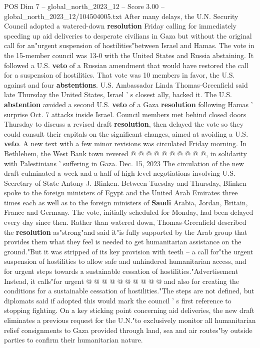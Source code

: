 \begin{textsample}{POS Dim 7 – global\_north\_2023\_12 – Score 3.00 – global\_north\_2023\_12/104504005.txt}  \label{ex:f7_pos_306}
After many delays, the U.N.
Security Council adopted a watered-down \textbf{resolution} Friday calling for immediately speeding up aid deliveries to desperate civilians in Gaza but without the original call for an"urgent suspension of hostilities"between Israel and Hamas.
The vote in the 15-member council was 13-0 with the United States and Russia abstaining.
It followed a U.S. \textbf{veto} of a Russian amendment that would have restored the call for a suspension of hostilities.
That vote was 10 members in favor, the U.S. against and four \textbf{abstentions}.
U.S.
Ambassador Linda Thomas-Greenfield said late Thursday the United States, Israel ' s closest ally, backed it.
The U.S. \textbf{abstention} avoided a second U.S. \textbf{veto} of a Gaza \textbf{resolution} following Hamas ' surprise Oct. 7 attacks inside Israel.
Council members met behind closed doors Thursday to discuss a revised draft \textbf{resolution}, then delayed the vote so they could consult their capitals on the significant changes, aimed at avoiding a U.S. \textbf{veto}.
A new text with a few minor revisions was circulated Friday morning.
In Bethlehem, the West Bank town revered @ @ @ @ @ @ @ @ @ @, in solidarity with Palestinians ' suffering in Gaza.
Dec. 15, 2023 The circulation of the new draft culminated a week and a half of high-level negotiations involving U.S.
Secretary of State Antony J.
Blinken.
Between Tuesday and Thursday, Blinken spoke to the foreign ministers of Egypt and the United Arab Emirates three times each as well as to the foreign ministers of \textbf{Saudi} Arabia, Jordan, Britain, France and Germany.
The vote, initially scheduled for Monday, had been delayed every day since then.
Rather than watered down, Thomas-Greenfield described the \textbf{resolution} as"strong"and said it"is fully supported by the Arab group that provides them what they feel is needed to get humanitarian assistance on the ground."But it was stripped of its key provision with teeth -- a call for"the urgent suspension of hostilities to allow safe and unhindered humanitarian access, and for urgent steps towards a sustainable cessation of hostilities."Advertisement Instead, it calls"for urgent @ @ @ @ @ @ @ @ @ @ and also for creating the conditions for a sustainable cessation of hostilities."The steps are not defined, but diplomats said if adopted this would mark the council ' s first reference to stopping fighting.
On a key sticking point concerning aid deliveries, the new draft eliminates a previous request for the U.N."to exclusively monitor all humanitarian relief consignments to Gaza provided through land, sea and air routes"by outside parties to confirm their humanitarian nature.

\end{textsample}

